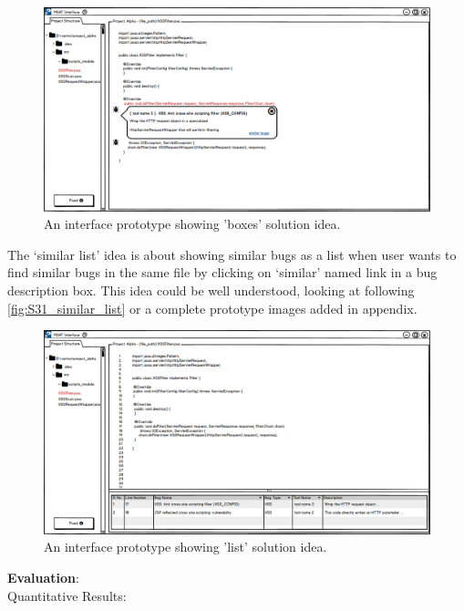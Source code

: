 \begin{figure}[hbt!]
	\centering
	\includegraphics[width=\linewidth]{figures/solution_ideas_snaps/S31_similar_boxes}
	\caption{An interface prototype showing 'boxes' solution idea.}
	\label{fig:S31_similar_boxes}
\end{figure} 

The ‘similar list’ idea is about showing similar bugs as a list when user wants to find similar bugs in the same file by clicking on ‘similar’ named link in a bug description box. This idea could be well understood, looking at following \autoref{fig:S31_similar_list} or a complete prototype images added in appendix. \\


\begin{figure}[hbt!]
	\centering
	\includegraphics[width=\linewidth]{figures/solution_ideas_snaps/S31_similar_list}
	\caption{An interface prototype showing 'list' solution idea.}
	\label{fig:S31_similar_list}
\end{figure} 


\textbf{Evaluation}: \\

Quantitative Results: \\

